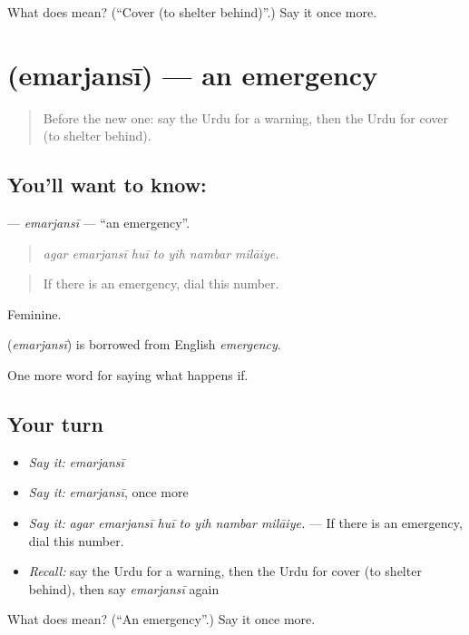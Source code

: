 \begin{tcolorbox}[breakable,colback=teal!4,colframe=teal!35!black,title={Before you move on}]
What does  mean? (\textquotedblleft{}Cover (to shelter behind)\textquotedblright{}.) Say it once more.
\end{tcolorbox}
\section[\texorpdfstring{\ur{ایمرجنسی} (emarjansī)}{ایمرجنسی (emarjansī)}]{ (emarjansī) — an emergency}

\label{lesson:UR-C536-emarjansi}



\begin{quote}
Before the new one: say the Urdu for a warning, then the Urdu for cover (to shelter behind).
\end{quote}

\subsection*{You'll want to know: }
\textbf{} — \emph{emarjansī} — \textquotedblleft{}an emergency\textquotedblright{}.

\begin{quote}
      
\end{quote}

\begin{quote}
\emph{agar emarjansī huī to yih nambar milāiye.}
\end{quote}

\begin{quote}
If there is an emergency, dial this number.
\end{quote}

Feminine.

\begin{cousinweb}
\textbf{} (\emph{emarjansī}) is borrowed from English \emph{emergency}.
\end{cousinweb}

\begin{grammarlens}[title={What you've built}]
One more word for saying what happens if.
\end{grammarlens}

\subsection*{Your turn}
\begin{itemize}
\raggedright
  \item \emph{Say it:} \emph{emarjansī}
  \item \emph{Say it:} \emph{emarjansī}, once more
  \item \emph{Say it:} \emph{agar emarjansī huī to yih nambar milāiye.} — If there is an emergency, dial this number.
  \item \emph{Recall:} say the Urdu for a warning, then the Urdu for cover (to shelter behind), then say \emph{emarjansī} again
\end{itemize}

\begin{tcolorbox}[breakable,colback=teal!4,colframe=teal!35!black,title={Before you move on}]
What does  mean? (\textquotedblleft{}An emergency\textquotedblright{}.) Say it once more.
\end{tcolorbox}
